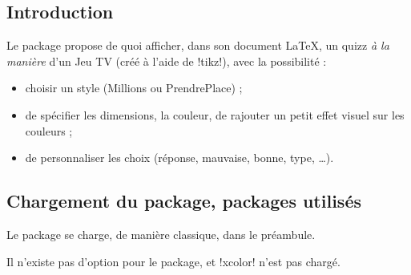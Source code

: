 \documentclass[french,a4paper,11pt]{article}
\begin{document}
\subsection{Introduction}

\begin{noteblock}
Le package propose de quoi afficher, dans son document \LaTeX, un quizz \textit{à la manière} d'un Jeu TV (créé à l'aide de \packagetex!tikz!), avec la possibilité :

\begin{itemize}
	\item choisir un style (\textsf{Millions} ou \textsf{PrendrePlace}) ;
	\item de spécifier les dimensions, la couleur, de rajouter un petit effet visuel sur les couleurs ;
	\item de personnaliser les choix (réponse, mauvaise, bonne, type, \ldots).
\end{itemize}
\vspace*{-\baselineskip}\leavevmode
\end{noteblock}

\subsection{Chargement du package, packages utilisés}

\begin{importantblock}
Le package se charge, de manière classique, dans le préambule.

Il n'existe pas d'option pour le package, et \packagetex!xcolor! n'est pas chargé.
\end{importantblock}

\end{document}
